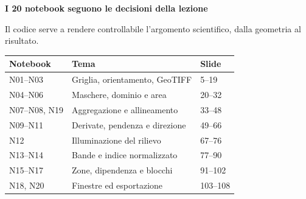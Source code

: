 \documentclass[12pt,aspectratio=1610]{beamer}
\begin{document}
\begin{frame}[plain]\hypertarget{slide109}{}
\begin{lrbox}{\TitleBox}
\begin{minipage}[t]{17.7cm}\raggedright\color{Ink}\fontsize{11.3}{14.8}\selectfont
\color{Navy}\bfseries\fontsize{20.6}{24.5}\selectfont I 20 notebook seguono le decisioni della lezione
\end{minipage}\end{lrbox}

\begin{lrbox}{\RecallBox}
\begin{minipage}[t]{14.3cm}\raggedright\color{Ink}\fontsize{11.3}{14.8}\selectfont
\fontsize{10.3}{13.8}\selectfont Il codice serve a rendere controllabile l’argomento scientifico, dalla geometria al risultato.
\end{minipage}\end{lrbox}

\begin{lrbox}{\PilotLeftBox}
\begin{minipage}[t]{10.05cm}\raggedright\color{Ink}\fontsize{11.3}{14.8}\selectfont
{\fontsize{10.2}{13.1}\selectfont\renewcommand{\arraystretch}{1.45}\begin{tabular}{@{}p{2.2cm}p{4.9cm}p{1.6cm}@{}}\toprule
\textbf{Notebook} & \textbf{Tema} & \textbf{Slide}\\\midrule
N01–N03 & Griglia, orientamento, GeoTIFF & 5–19\\
N04–N06 & Maschere, dominio e area & 20–32\\
N07–N08, N19 & Aggregazione e allineamento & 33–48\\
N09–N11 & Derivate, pendenza e direzione & 49–66\\
N12 & Illuminazione del rilievo & 67–76\\
N13–N14 & Bande e indice normalizzato & 77–90\\
N15–N17 & Zone, dipendenza e blocchi & 91–102\\
N18, N20 & Finestre ed esportazione & 103–108\\
\bottomrule\end{tabular}}

\end{minipage}\end{lrbox}


\end{frame}
\end{document}
